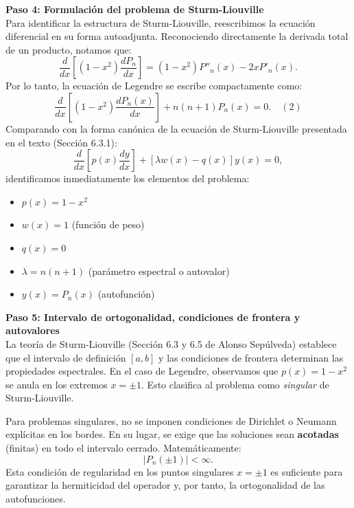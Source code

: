 \documentclass[a4paper]{article}
\begin{document}
\vspace{0.3cm}
\noindent\textbf{Paso 4: Formulación del problema de Sturm-Liouville}\\
Para identificar la estructura de Sturm-Liouville, reescribimos la ecuación diferencial en su forma autoadjunta. Reconociendo directamente la derivada total de un producto, notamos que:
$$
\frac{d}{dx}\left[ (1 - x^2) \frac{dP_n}{dx} \right] = (1 - x^2)P''_n(x) - 2x P'_n(x).
$$
Por lo tanto, la ecuación de Legendre se escribe compactamente como:
$$
\frac{d}{dx}\left[ (1 - x^2) \frac{dP_n(x)}{dx} \right] + n(n+1) P_n(x) = 0. \quad (2)
$$
Comparando con la forma canónica de la ecuación de Sturm-Liouville presentada en el texto (Sección 6.3.1):
$$
\frac{d}{dx}\left[ p(x) \frac{dy}{dx} \right] + \left[ \lambda w(x) - q(x) \right] y(x) = 0,
$$
identificamos inmediatamente los elementos del problema:
\begin{itemize}
    \item $p(x) = 1 - x^2$
    \item $w(x) = 1$ (función de peso)
    \item $q(x) = 0$
    \item $\lambda = n(n+1)$ (parámetro espectral o autovalor)
    \item $y(x) = P_n(x)$ (autofunción)
\end{itemize}

\vspace{0.3cm}
\noindent\textbf{Paso 5: Intervalo de ortogonalidad, condiciones de frontera y autovalores}\\
La teoría de Sturm-Liouville (Sección 6.3 y 6.5 de Alonso Sepúlveda) establece que el intervalo de definición $[a, b]$ y las condiciones de frontera determinan las propiedades espectrales. En el caso de Legendre, observamos que $p(x) = 1 - x^2$ se anula en los extremos $x = \pm 1$. Esto clasifica al problema como \textit{singular} de Sturm-Liouville. 

Para problemas singulares, no se imponen condiciones de Dirichlet o Neumann explícitas en los bordes. En su lugar, se exige que las soluciones sean \textbf{acotadas} (finitas) en todo el intervalo cerrado. Matemáticamente:
$$
|P_n(\pm 1)| < \infty.
$$
Esta condición de regularidad en los puntos singulares $x = \pm 1$ es suficiente para garantizar la hermiticidad del operador y, por tanto, la ortogonalidad de las autofunciones.
\end{document}
